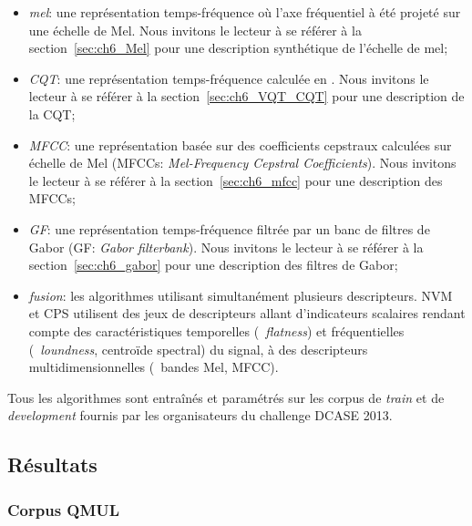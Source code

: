 \begin{itemize}
\item \emph{mel}: une représentation temps-fréquence où l'axe fréquentiel à été projeté sur une échelle de Mel. Nous invitons le lecteur à se référer à la section~\ref{sec:ch6_Mel} pour une description synthétique de l'échelle de mel;
\item \emph{CQT}: une représentation temps-fréquence calculée en . Nous invitons le lecteur à se référer à la section~\ref{sec:ch6_VQT_CQT} pour une description de la CQT;
\item \emph{MFCC}: une représentation basée sur des coefficients cepstraux calculées sur échelle de Mel (MFCCs: \emph{Mel-Frequency Cepstral Coefficients}). Nous invitons le lecteur à se référer à la section~\ref{sec:ch6_mfcc} pour une description des MFCCs;
\item \emph{GF}: une représentation temps-fréquence filtrée par un banc de filtres de Gabor (GF: \emph{Gabor filterbank}). Nous invitons le lecteur à se référer à la section~\ref{sec:ch6_gabor} pour une description des filtres de Gabor;
\item \emph{fusion}: les algorithmes utilisant simultanément plusieurs descripteurs. NVM et CPS utilisent des jeux de descripteurs allant d'indicateurs scalaires rendant compte des caractéristiques temporelles (\eg~\emph{flatness}) et fréquentielles (\eg~\emph{loundness}, centroïde spectral) du signal, à des descripteurs multidimensionnelles (\eg~bandes Mel, MFCC).
\end{itemize}

Tous les algorithmes sont entraînés et paramétrés sur les corpus de \emph{train} et de \emph{development} fournis par les organisateurs du challenge DCASE 2013. \\

\subsection{Résultats}

\subsubsection{Corpus QMUL}

